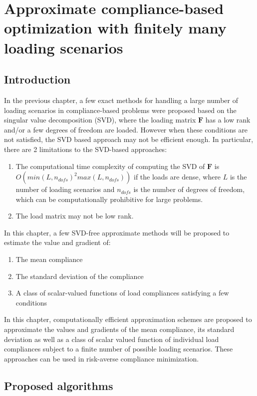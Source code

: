 \chapter{Approximate compliance-based optimization with finitely many loading scenarios}\thispagestyle{EmptyHeader}
\label{chp:4}

\section{Introduction}

In the previous chapter, a few exact methods for handling a large number of loading scenarios in compliance-based problems were proposed based on the singular value decomposition (SVD), where the loading matrix $\bm{F}$ has a low rank and/or a few degrees of freedom are loaded. However when these conditions are not satisfied, the SVD based approach may not be efficient enough. In particular, there are 2 limitations to the SVD-based approaches:
\begin{enumerate}
  \item The computational time complexity of computing the SVD of $\bm{F}$ is \newline $O(min(L, n_{dofs})^2 max(L, n_{dofs}))$ if the loads are dense, where $L$ is the number of loading scenarios and $n_{dofs}$ is the number of degrees of freedom, which can be computationally prohibitive for large problems.
  \item The load matrix may not be low rank.
\end{enumerate}

In this chapter, a few SVD-free approximate methods will be proposed to estimate the value and gradient of:
\begin{enumerate}
    \item The mean compliance
    \item The standard deviation of the compliance
    \item A class of scalar-valued functions of load compliances satisfying a few conditions
\end{enumerate}

In this chapter, computationally efficient approximation schemes are proposed to approximate the values and gradients of the mean compliance, its standard deviation as well as a class of scalar valued function of individual load compliances subject to a finite number of possible loading scenarios. These approaches can be used in risk-averse compliance minimization.

\section{Proposed algorithms}

